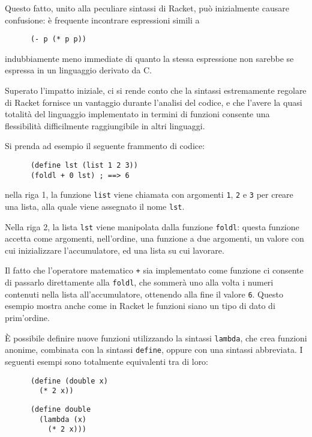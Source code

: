 Questo fatto, unito alla peculiare sintassi di Racket, pu\`o inizialmente
causare confusione: \`e frequente incontrare espressioni simili a

\begin{lstlisting}
      (- p (* p p))
\end{lstlisting}

indubbiamente meno immediate di quanto la stessa espressione non sarebbe
se espressa in un linguaggio derivato da C.

Superato l'impatto iniziale, ci si rende conto che la sintassi estremamente
regolare di Racket fornisce un vantaggio durante l'analisi del codice, e
che l'avere la quasi totalit\`a del linguaggio implementato in termini di
funzioni consente una flessibilit\`a difficilmente raggiungibile in altri
linguaggi.

Si prenda ad esempio il seguente frammento di codice:

\begin{lstlisting}
      (define lst (list 1 2 3))
      (foldl + 0 lst) ; ==> 6
\end{lstlisting}

nella riga 1, la funzione \lstinline{list} viene chiamata con argomenti
\lstinline{1}, \lstinline{2} e \lstinline{3} per creare una lista, alla
quale viene assegnato il nome \lstinline{lst}.

Nella riga 2, la lista \lstinline{lst} viene manipolata dalla funzione
\lstinline{foldl}: questa funzione accetta come argomenti, nell'ordine,
una funzione a due argomenti, un valore con cui inizializzare
l'accumulatore, ed una lista su cui lavorare.

Il fatto che l'operatore matematico \lstinline{+} sia implementato come
funzione ci consente di passarlo direttamente alla \lstinline{foldl}, che
sommer\`a uno alla volta i numeri contenuti nella lista all'accumulatore,
ottenendo alla fine il valore \lstinline{6}. Questo esempio mostra anche
come in Racket le funzioni siano un tipo di dato di prim'ordine.

\`E possibile definire nuove funzioni utilizzando la sintassi
\lstinline{lambda}, che crea funzioni anonime, combinata con la sintassi
\lstinline{define}, oppure con una sintassi abbreviata. I seguenti esempi
sono totalmente equivalenti tra di loro:

\begin{lstlisting}
      (define (double x)
        (* 2 x))
\end{lstlisting}

\begin{lstlisting}
      (define double
        (lambda (x)
          (* 2 x)))
\end{lstlisting}

